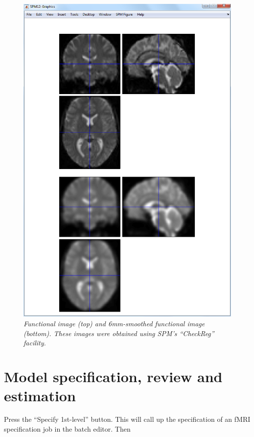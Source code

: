\begin{figure}
\begin{center}
\includegraphics[width=125mm]{auditory/smooth}
\caption{\em Functional image (top) and 6mm-smoothed functional image (bottom). These images were obtained using SPM's ``CheckReg'' facility. \label{aud_smooth}}
\end{center}
\end{figure}

\section{Model specification, review and estimation}

Press the ``Specify 1st-level'' button. This will call up the specification of an fMRI specification job in the batch editor. Then


